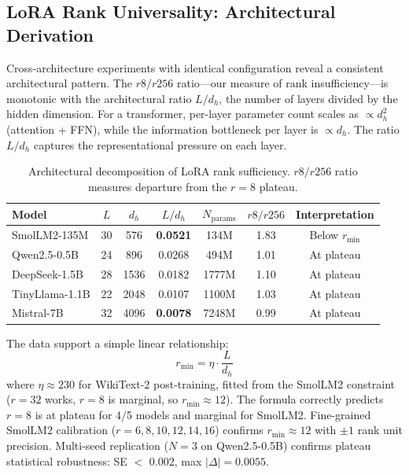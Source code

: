 \documentclass[11pt]{article}
\begin{document}
\subsection{LoRA Rank Universality: Architectural Derivation}

Cross-architecture experiments with identical configuration reveal a consistent architectural pattern. The $r8/r256$ ratio---our measure of rank insufficiency---is monotonic with the architectural ratio $L/d_h$, the number of layers divided by the hidden dimension. For a transformer, per-layer parameter count scales as $\propto d_h^2$ (attention + FFN), while the information bottleneck per layer is $\propto d_h$. The ratio $L/d_h$ captures the representational pressure on each layer.

\begin{table}[h]
\centering
\caption{Architectural decomposition of LoRA rank sufficiency. $r8/r256$ ratio measures departure from the $r=8$ plateau.}
\label{tab:arch_ratio}
\begin{tabular}{@{}lcccccc@{}}
\toprule
\textbf{Model} & $L$ & $d_h$ & $L/d_h$ & $N_{\text{params}}$ & $r8/r256$ & \textbf{Interpretation} \\
\midrule
SmolLM2-135M & 30 & 576 & \textbf{0.0521} & 134M & 1.83 & Below $r_{\min}$ \\
Qwen2.5-0.5B & 24 & 896 & 0.0268 & 494M & 1.01 & At plateau \\
DeepSeek-1.5B & 28 & 1536 & 0.0182 & 1777M & 1.10 & At plateau \\
TinyLlama-1.1B & 22 & 2048 & 0.0107 & 1100M & 1.03 & At plateau \\
Mistral-7B & 32 & 4096 & \textbf{0.0078} & 7248M & 0.99 & At plateau \\
\bottomrule
\end{tabular}
\end{table}

The data support a simple linear relationship:
\begin{equation}
r_{\min} = \eta \cdot \frac{L}{d_h}
\end{equation}
where $\eta \approx 230$ for WikiText-2 post-training, fitted from the SmolLM2 constraint ($r=32$ works, $r=8$ is marginal, so $r_{\min} \approx 12$). The formula correctly predicts $r=8$ is at plateau for 4/5 models and marginal for SmolLM2. Fine-grained SmolLM2 calibration ($r=6,8,10,12,14,16$) confirms $r_{\min} \approx 12$ with $\pm 1$ rank unit precision. Multi-seed replication ($N=3$ on Qwen2.5-0.5B) confirms plateau statistical robustness: SE $<$ 0.002, max $|\Delta| = 0.0055$.
\end{document}
